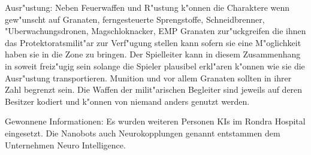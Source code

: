 \begin{remarks}
	Ausr"ustung: Neben Feuerwaffen und R"ustung k"onnen die Charaktere wenn gew"unscht auf Granaten, ferngesteuerte Sprengstoffe, Schneidbrenner, "Uberwachungsdronen, Magschlo\3knacker, EMP Granaten zur"uckgreifen die ihnen das Protektoratsmilit"ar zur Verf"ugung stellen kann sofern sie eine M"oglichkeit haben sie in die Zone zu bringen. Der Spielleiter kann in diesem Zusammenhang in soweit freiz"ugig sein solange die Spieler plausibel erkl"aren k"onnen wie sie die Ausr"ustung transportieren. Munition und vor allem Granaten sollten in ihrer Zahl begrenzt sein. Die Waffen der milit"arischen Begleiter sind jeweils auf deren Besitzer kodiert und k"onnen von
	niemand anders genutzt werden.

	Gewonnene Informationen:  Es wurden weiteren Personen KIs im Rondra Hospital eingesetzt. Die Nanobots auch Neurokopplungen genannt entstammen dem Unternehmen Neuro Intelligence. 
\end{remarks}
